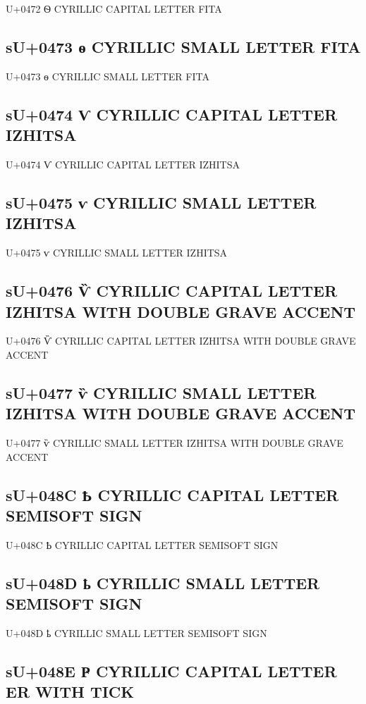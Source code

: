 U+0472 Ѳ  CYRILLIC CAPITAL LETTER FITA

\subsection{sU+0473 ѳ  CYRILLIC SMALL LETTER FITA}

U+0473 ѳ  CYRILLIC SMALL LETTER FITA

\subsection{sU+0474 Ѵ  CYRILLIC CAPITAL LETTER IZHITSA}

U+0474 Ѵ  CYRILLIC CAPITAL LETTER IZHITSA

\subsection{sU+0475 ѵ  CYRILLIC SMALL LETTER IZHITSA}

U+0475 ѵ  CYRILLIC SMALL LETTER IZHITSA

\subsection{sU+0476 Ѷ  CYRILLIC CAPITAL LETTER IZHITSA WITH DOUBLE GRAVE ACCENT}

U+0476 Ѷ  CYRILLIC CAPITAL LETTER IZHITSA WITH DOUBLE GRAVE ACCENT

\subsection{sU+0477 ѷ  CYRILLIC SMALL LETTER IZHITSA WITH DOUBLE GRAVE ACCENT}

U+0477 ѷ  CYRILLIC SMALL LETTER IZHITSA WITH DOUBLE GRAVE ACCENT

\subsection{sU+048C Ҍ  CYRILLIC CAPITAL LETTER SEMISOFT SIGN}

U+048C Ҍ  CYRILLIC CAPITAL LETTER SEMISOFT SIGN

\subsection{sU+048D ҍ  CYRILLIC SMALL LETTER SEMISOFT SIGN}

U+048D ҍ  CYRILLIC SMALL LETTER SEMISOFT SIGN

\subsection{sU+048E Ҏ  CYRILLIC CAPITAL LETTER ER WITH TICK}


